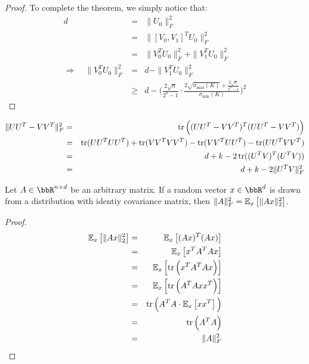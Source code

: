 \begin{proof}
To complete the theorem, we simply notice that:
\begin{eqnarray}
d &=& \|U_0\|_F^2 \\
&=&\|[V_0,V_1]^T U_0\|_F^2 \\
&=& \|V_0^T U_0\|_F^2 + \|V_1^T U_0\|_F^2\\
\Longrightarrow\quad  \|V_0^T U_0\|_F^2 &=& d - \|V_1^T U_0\|_F^2 \\
&\geq& d - \Bigg(\frac{2\sqrt{n}}{2^b-1} \cdot \frac{2\sqrt{\sigma_{\max}(K)} + \frac{2\sqrt{n}}{2^b-1} }{\sigma_{\min}(K)} \Bigg)^2
\end{eqnarray}
\end{proof}

\begin{lemma}
\label{lemma1}
\begin{eqnarray*}
	\|UU^T - VV^T \|_F^2 &=& \tr\Big( (UU^T - VV^T)^T (UU^T - VV^T)  \Big)\\
	&=& \tr(UU^TUU^T) + \tr(VV^T VV^T) - \tr(VV^T UU^T) - \tr(UU^T VV^T) \\
	&=& d + k - 2 \tr((U^T V)^T (U^T V)) \\
	&=& d + k - 2 \|U^T V\|_F^2
\end{eqnarray*}
\end{lemma}

\begin{lemma}
\label{lemma2}
Let $A \in \RR^{n\times d}$ be an arbitrary matrix. If a random vector $x \in \RR^d$ is drawn from a distribution with identiy covariance matrix, then $\|A\|_F^2 = \expect{x}{\|Ax\|_2^2}$.
\end{lemma}
\begin{proof}
\begin{eqnarray*}
\expect{x}{\|Ax\|_2^2} &=& \expect{x}{(Ax)^T (Ax)} \\
&=& \expect{x}{x^T A^T A x} \\
&=& \expect{x}{\tr \Big(x^T A^T A x\Big)} \\
&=& \expect{x}{\tr \Big(A^T A x x^T\Big)} \\
&=& \tr \Big(A^T A \cdot \expect{x}{x x^T}\Big) \\
&=& \tr \Big(A^T A\Big) \\
&=& \|A\|_F^2 \\
\end{eqnarray*}
\end{proof}

